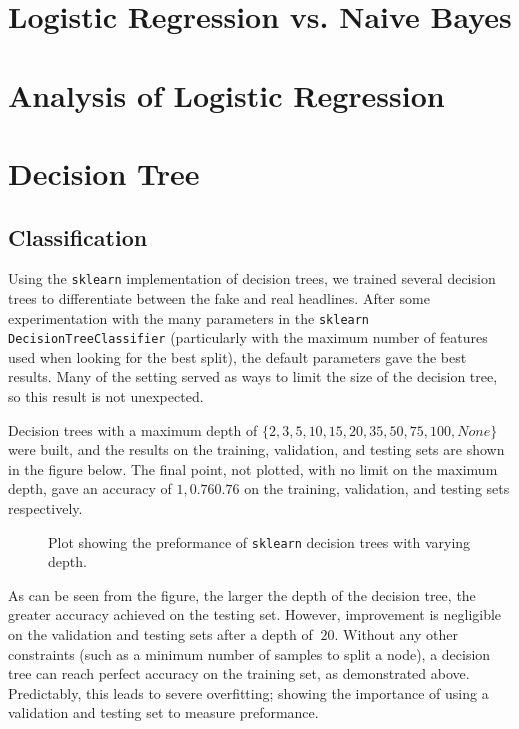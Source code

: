 \documentclass{article}
\begin{document}
   \section{Logistic Regression vs. Naive Bayes}

   \section{Analysis of Logistic Regression}

   \section{Decision Tree}
   \subsection{Classification}
   Using the \texttt{sklearn} implementation of decision trees, we trained several decision trees
   to differentiate between the fake and real headlines. After some experimentation with the many parameters
   in the \texttt{sklearn DecisionTreeClassifier} (particularly with the maximum number of features used
   when looking for the best split), the default parameters gave the best results. Many of the setting served
   as ways to limit the size of the decision tree, so this result is not unexpected.

   Decision trees with a maximum depth of $\{ 2, 3, 5, 10, 15, 20, 35, 50, 75, 100, None \}$ were built, and
   the results on the training, validation, and testing sets are shown in the figure below. The final point,
   not plotted, with no limit on the maximum depth, gave an accuracy of $1, 0.76 0.76$ on the training,
   validation, and testing sets respectively.
      \begin{figure}[h] \centering
         \caption{Plot showing the preformance of \texttt{sklearn} decision trees with
            varying depth. }
      \end{figure}
   As can be seen from the figure, the larger the depth of the decision tree, the greater accuracy achieved on
   the testing set. However, improvement is negligible on the validation and testing sets after a depth of
   $~20$. Without any other constraints (such as a minimum number of samples to split a node), a decision tree
   can reach perfect accuracy on the training set, as demonstrated above. Predictably, this leads to
   severe overfitting; showing the importance of using a validation and testing set to measure preformance.
\end{document}
